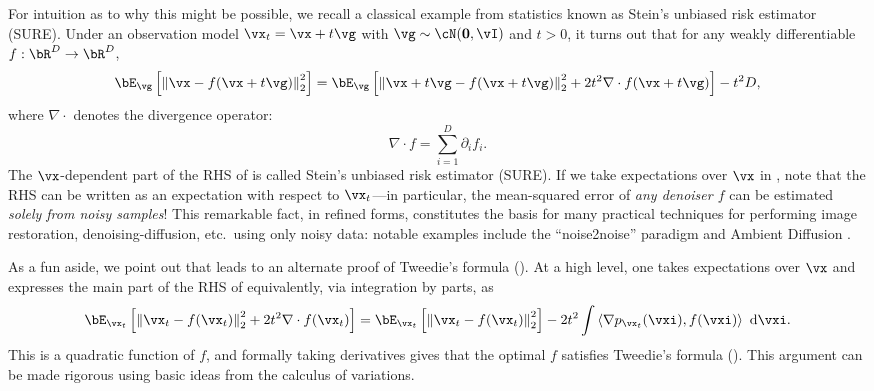 \documentclass[../../book-main.tex]{subfiles}
\begin{document}
For intuition as to why this might be possible, we recall a classical example
from statistics known as Stein's unbiased risk estimator (SURE).
Under an observation model $\vx_t = \vx + t \vg$ with $\vg \sim \cN(\Zero,
\vI)$ and $t>0$, it turns out that for any weakly differentiable $f : \bR^D \to \bR^D$,
\begin{equation}\label{eq:sure-risk}
  \bE_{\vg}\left[
    \norm*{\vx - f(\vx + t \vg)}_2^2
    \right]
  =
  \bE_{\vg}\left[
    \norm*{\vx+t\vg - f(\vx + t \vg)}_2^2
    + 2t^2 \nabla \cdot f(\vx + t\vg)
    \right]
  - t^2 D,
\end{equation}
where $\nabla \cdot$ denotes the divergence operator:
\begin{equation*}
	\nabla \cdot f = \sum_{i=1}^D \partial_i f_i.
\end{equation*}
The $\vx$-dependent part of the RHS of  is called Stein's unbiased risk
estimator (SURE). If we take expectations over $\vx$ in ,
note that the RHS can be written as an expectation with respect to $\vx_t$---in
particular, the mean-squared error of \textit{any denoiser $f$} can be estimated
\textit{solely from noisy samples}!
This remarkable fact, in refined forms, constitutes the basis for many practical
techniques for performing image restoration, denoising-diffusion, etc.\ using
only noisy data: notable examples include the ``noise2noise'' paradigm
\cite{pmlr-v80-lehtinen18a}
and Ambient Diffusion \cite{daras2023ambient}.

As a fun aside, we point out that  leads to an alternate
proof of Tweedie's formula (). At a high level, one takes
expectations over $\vx$ and expresses the main part of the RHS of
 equivalently, via integration by parts, as
\begin{equation}
  \bE_{\vx_t}\left[
    \norm*{\vx_t - f(\vx_t)}_2^2
    + 2t^2 \nabla \cdot f(\vx_t)
    \right]
  =
  \bE_{\vx_t}\left[
    \norm*{\vx_t - f(\vx_t)}_2^2
    \right]
  - 2t^2 \int
  \ip*{\nabla p_{\vx_t}(\vxi)}{f(\vxi)}
  \odif \vxi.
\end{equation}
This is a quadratic function of $f$, and formally taking derivatives gives
that the optimal $f$ satisfies Tweedie's formula (). This
argument can be made rigorous using basic ideas from the calculus of variations.
\end{document}
